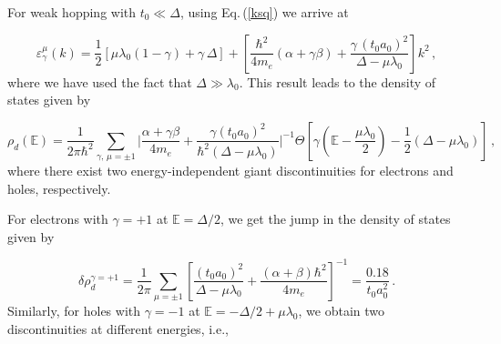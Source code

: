 \documentclass[aps,prb,showpacs]{revtex4}
\newcommand{\mbb}{\mathbb}
\begin{document}
For weak hopping with $t_0\ll\Delta$, using Eq.\,(\ref{ksq}) we arrive at 
 
\begin{equation}
\varepsilon_{\gamma}^{\mu}(k)  = \frac{1}{2} \left[ 
\mu\lambda_0 (1 - \gamma) + \gamma \, \Delta 
\right] + \left[
\frac{\hbar^2}{4 m_e} (\alpha + \gamma \beta ) + \frac{\gamma \, (t_0a_0)^2}{\Delta -\mu\lambda_0}
\right] k^2 \, ,
\label{parab}
\end{equation}
where we have used the fact that $\Delta\gg\lambda_0$. This result leads to the density of states given by

\begin{equation}
\rho_d(\mbb{E}) = \frac{1}{2\pi\hbar^2} \sum \limits_{\gamma,\,\mu = \pm 1}
\Big| \frac{\alpha+\gamma \beta}{4 m_e} + \frac{\gamma (t_0a_0)^2}{ \hbar^2(\Delta - \mu\lambda_0)} \Big|^{-1}
\Theta \left[
\gamma\left(\mbb{E} -\frac{\mu\lambda_0}{2} \right) - \frac{1}{2} \left( \Delta -\mu\lambda_0 \right)
\right]\, ,
\end{equation}
where there exist two energy-independent giant discontinuities for electrons and holes, respectively.  
\medskip

For electrons with $\gamma=+1$ at $\mbb{E}= \Delta/2$, we get the jump in the density of states given by

\begin{equation}
\delta\rho_d^{\gamma =+1} = \frac{1}{2 \pi} \sum\limits_{\mu= \pm 1}
\left[  
\frac{(t_0a_0)^2}{\Delta -\mu\lambda_0} +
\frac{(\alpha + \beta) \hbar^2}{4 m_e} 
\right]^{-1} = \frac{0.18}{t_0a_0^2}\, .
\end{equation}
Similarly, for holes with $\gamma=-1$ at $\mbb{E}= -\Delta/2+\mu\lambda_0$, we obtain two discontinuities at different energies, i.e.,
\end{document}
